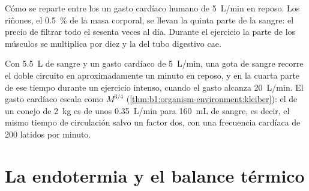 \begin{omfigure}

{\small Cómo se reparte entre los  un gasto cardíaco humano de
\qty{5}{L/min} en reposo. Los riñones, el \qty{0.5}{\%} de la masa
corporal, se llevan la quinta parte de la sangre: el precio de filtrar todo
el  sesenta veces al día. Durante el ejercicio la parte de los
músculos se multiplica por diez y la del tubo digestivo cae.}
\end{omfigure}

\begin{example}\label{ex:b1:mammal-organization:circtime}
Con \qty{5.5}{L} de sangre y un gasto cardíaco de \qty{5}{L/min}, una gota de
sangre recorre el doble circuito en aproximadamente un minuto en reposo, y en
la cuarta parte de ese tiempo durante un ejercicio intenso, cuando el gasto
alcanza \qty{20}{L/min}. El gasto cardíaco escala como $M^{3/4}$
(\cref{thm:b1:organism-environment:kleiber}): el de un conejo de \qty{2}{kg}
es de unos \qty{0.35}{L/min} para \qty{160}{mL} de sangre, es decir, el mismo
tiempo de circulación salvo un factor dos, con una frecuencia cardíaca de
\qty{200}{} latidos por minuto.
\end{example}

\section{La endotermia y el balance térmico}

